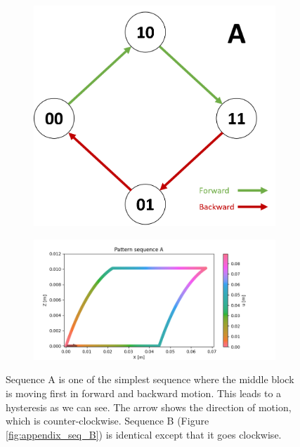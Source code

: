         \begin{figure}[h]
            \centering
            \begin{subfigure}{.2\textwidth}
            \includegraphics[width=\textwidth]{images/S_A.png}
            \end{subfigure}%
            \begin{subfigure}{.6\textwidth}
            \includegraphics[width=\textwidth]{images/A.png}
            \end{subfigure}
            \caption{Sequence A is one of the simplest sequence where the middle block is moving first in forward and backward motion. This leads to a hysteresis as we can see. The arrow shows the direction of motion, which is counter-clockwise. Sequence B (Figure \ref{fig:appendix_seq_B}) is identical except that it goes clockwise.}
        \end{figure}
        
